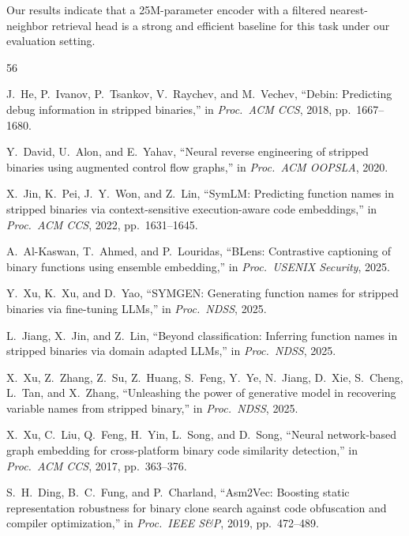 \documentclass[sigconf,nonacm]{acmart}
\begin{document}
Our results indicate that a 25M-parameter encoder with a filtered nearest-neighbor retrieval head is a strong and efficient baseline for this task under our evaluation setting.



{\small
\begin{thebibliography}{56}

J.~He, P.~Ivanov, P.~Tsankov, V.~Raychev, and M.~Vechev, ``Debin: Predicting debug information in stripped binaries,'' in \emph{Proc.\ ACM CCS}, 2018, pp.~1667--1680.

Y.~David, U.~Alon, and E.~Yahav, ``Neural reverse engineering of stripped binaries using augmented control flow graphs,'' in \emph{Proc.\ ACM OOPSLA}, 2020.

X.~Jin, K.~Pei, J.~Y.~Won, and Z.~Lin, ``SymLM: Predicting function names in stripped binaries via context-sensitive execution-aware code embeddings,'' in \emph{Proc.\ ACM CCS}, 2022, pp.~1631--1645.

A.~Al-Kaswan, T.~Ahmed, and P.~Louridas, ``BLens: Contrastive captioning of binary functions using ensemble embedding,'' in \emph{Proc.\ USENIX Security}, 2025.

Y.~Xu, K.~Xu, and D.~Yao, ``SYMGEN: Generating function names for stripped binaries via fine-tuning LLMs,'' in \emph{Proc.\ NDSS}, 2025.

L.~Jiang, X.~Jin, and Z.~Lin, ``Beyond classification: Inferring function names in stripped binaries via domain adapted LLMs,'' in \emph{Proc.\ NDSS}, 2025.

X.~Xu, Z.~Zhang, Z.~Su, Z.~Huang, S.~Feng, Y.~Ye, N.~Jiang, D.~Xie, S.~Cheng, L.~Tan, and X.~Zhang, ``Unleashing the power of generative model in recovering variable names from stripped binary,'' in \emph{Proc.\ NDSS}, 2025.

X.~Xu, C.~Liu, Q.~Feng, H.~Yin, L.~Song, and D.~Song, ``Neural network-based graph embedding for cross-platform binary code similarity detection,'' in \emph{Proc.\ ACM CCS}, 2017, pp.~363--376.

S.~H.~Ding, B.~C.~Fung, and P.~Charland, ``Asm2Vec: Boosting static representation robustness for binary clone search against code obfuscation and compiler optimization,'' in \emph{Proc.\ IEEE S\&P}, 2019, pp.~472--489.


\end{thebibliography}}
\end{document}
